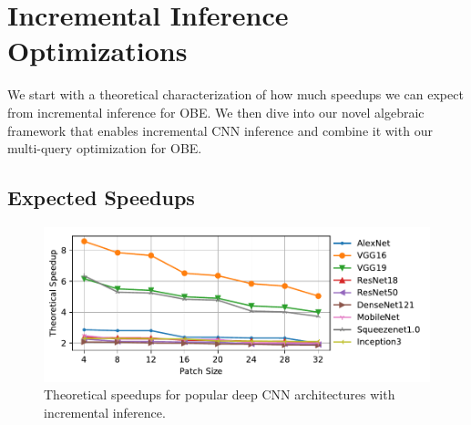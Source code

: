 \section{Incremental Inference Optimizations}\label{sec:exact}
We start with a theoretical characterization of how much speedups we can expect from incremental inference for OBE. We then dive into our novel algebraic framework that enables incremental CNN inference and combine it with our multi-query optimization for OBE.


\vspace{-2mm}
\subsection{Expected Speedups}

\begin{figure}[t]
\includegraphics[width=\columnwidth]{images/redundancy_ratio}
\caption{Theoretical speedups for popular deep CNN architectures with incremental inference.}
\label{fig:redundancy_ratio}
\vspace{-8mm}
\end{figure}

